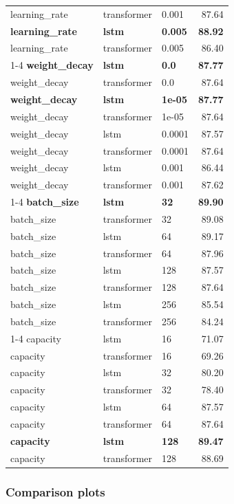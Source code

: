 \documentclass[14pt]{article}
\begin{document}
\begin{longtable}{lllr}
learning\_rate & transformer & 0.001 & 87.64 \\
\textbf{learning\_rate} & \textbf{lstm} & \textbf{0.005} & \textbf{88.92} \\
learning\_rate & transformer & 0.005 & 86.40 \\
\cmidrule(lr){1-4}
\textbf{weight\_decay} & \textbf{lstm} & \textbf{0.0} & \textbf{87.77} \\
weight\_decay & transformer & 0.0 & 87.64 \\
\textbf{weight\_decay} & \textbf{lstm} & \textbf{1e-05} & \textbf{87.77} \\
weight\_decay & transformer & 1e-05 & 87.64 \\
weight\_decay & lstm & 0.0001 & 87.57 \\
weight\_decay & transformer & 0.0001 & 87.64 \\
weight\_decay & lstm & 0.001 & 86.44 \\
weight\_decay & transformer & 0.001 & 87.62 \\
\cmidrule(lr){1-4}
\textbf{batch\_size} & \textbf{lstm} & \textbf{32} & \textbf{89.90} \\
batch\_size & transformer & 32 & 89.08 \\
batch\_size & lstm & 64 & 89.17 \\
batch\_size & transformer & 64 & 87.96 \\
batch\_size & lstm & 128 & 87.57 \\
batch\_size & transformer & 128 & 87.64 \\
batch\_size & lstm & 256 & 85.54 \\
batch\_size & transformer & 256 & 84.24 \\
\cmidrule(lr){1-4}
capacity & lstm & 16 & 71.07 \\
capacity & transformer & 16 & 69.26 \\
capacity & lstm & 32 & 80.20 \\
capacity & transformer & 32 & 78.40 \\
capacity & lstm & 64 & 87.57 \\
capacity & transformer & 64 & 87.64 \\
\textbf{capacity} & \textbf{lstm} & \textbf{128} & \textbf{89.47} \\
capacity & transformer & 128 & 88.69 \\
\bottomrule
\end{longtable}

\subsubsection{Comparison plots}
\end{document}
